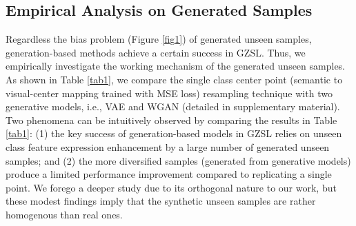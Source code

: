 \documentclass{article}
\begin{document}
	\subsection{Empirical Analysis on Generated Samples }
\label{prior}
	\begin{table}[H]
		\centering
		\caption{ZSL (T1) and GZSL ($\mathcal{A}^H$) results of the simple semantic-visual mapping net (denoted as MSE) and two different generative models, VAE and WGAN on AWA2. {\bf G.N.} denotes the generation number per unseen class (588 is the class averaged number of real seen samples).}
        \vspace{-2ex}
		\label{tab1}
	\end{table}
	Regardless the bias problem (Figure \ref{fig1}) of generated unseen samples, generation-based methods achieve a certain success in GZSL. Thus, we empirically investigate the working mechanism of the generated unseen samples. As shown in Table \ref{tab1}, we compare the single class center point (semantic to visual-center mapping trained with MSE loss) resampling technique with two generative models, i.e., VAE \cite{kingma2013auto} and WGAN \cite{gulrajani2017improved} (detailed in supplementary material). Two phenomena can be intuitively observed by comparing the results in Table \ref{tab1}: (1) the key success of generation-based models in GZSL relies on unseen class feature expression enhancement by a large number of generated unseen samples; and (2) the more diversified samples (generated from generative models) produce a limited performance improvement compared to replicating a single point. We forego a deeper study due to its orthogonal nature to our work, but these modest findings imply that the synthetic unseen samples are rather homogenous than real ones.
	
\end{document}
